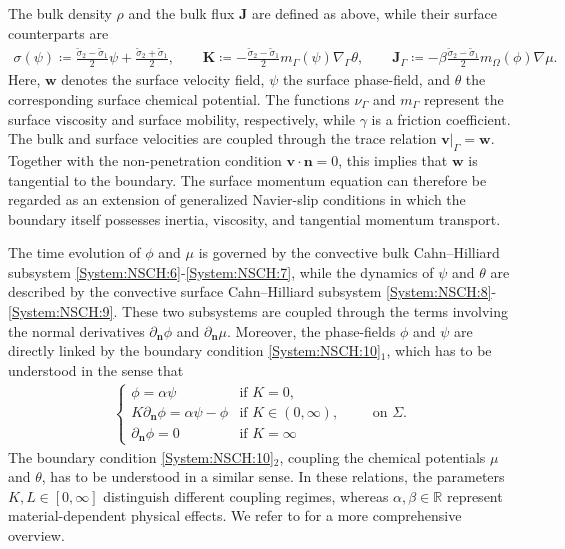 \documentclass[11pt,reqno]{amsart}
\theoremstyle{remark}
\numberwithin{equation}{section}
\newcommand{\R}{\mathbb R}
\newcommand{\n}{\mathbf{n}}
\newcommand{\deln}{\partial_\n}
\newcommand{\Grad}{\nabla}
\newcommand{\Gradg}{\nabla_\Ga}
\newcommand{\Om}{\Omega}
\newcommand{\Ga}{\Gamma}
\newcommand{\J}{\mathbf J}
\newcommand{\K}{\mathbf K}
\newcommand{\bv}{\mathbf v}
\newcommand{\bw}{\mathbf w}
\begin{document}
The bulk density $\rho$ and the bulk flux $\J$ are defined as above, while their surface counterparts are
\begin{align*}
    \sigma(\psi) \coloneqq\frac{\tilde\sigma_2-\tilde\sigma_1}{2}\psi+\frac{\tilde\sigma_2+\tilde\sigma_1}{2}, \qquad\K \coloneqq-\frac{\tilde\sigma_2-\tilde\sigma_1}{2}m_\Ga(\psi)\Gradg\theta, \qquad \J_\Ga \coloneqq-\beta\frac{\tilde\sigma_2-\tilde\sigma_1}{2}m_\Om(\phi)\Grad\mu.
\end{align*}
Here, $\bw$ denotes the surface velocity field, $\psi$ the surface phase-field, and $\theta$ the corresponding surface chemical potential. The functions $\nu_\Ga$ and $m_\Ga$ represent the surface viscosity and surface mobility, respectively, while $\gamma$ is a friction coefficient. The bulk and surface velocities are coupled through the trace relation $\bv\vert_\Ga=\bw$. Together with the non-penetration condition $\bv\cdot\n=0$, this implies that $\bw$ is tangential to the boundary. The surface momentum equation can therefore be regarded as an extension of generalized Navier-slip conditions in which the boundary itself possesses inertia, viscosity, and tangential momentum transport.

The time evolution of $\phi$ and $\mu$ is governed by the convective bulk Cahn--Hilliard subsystem \eqref{System:NSCH:6}-\eqref{System:NSCH:7}, while the dynamics of $\psi$ and $\theta$ are described by the convective surface Cahn--Hilliard subsystem \eqref{System:NSCH:8}-\eqref{System:NSCH:9}. These two subsystems are coupled through the terms involving the normal derivatives $\deln\phi$ and $\deln\mu$. Moreover, the phase-fields $\phi$ and $\psi$ are directly linked by the boundary condition \eqref{System:NSCH:10}$_1$, which has to be understood in the sense that
\begin{align*}
    \begin{cases}
        \phi = \alpha\psi &\text{if~} K = 0, \\
        K\deln\phi = \alpha\psi - \phi &\text{if~}K\in(0,\infty), \\
        \deln\phi = 0 &\text{if~} K = \infty
    \end{cases}
    \qquad\text{on~}\Sigma.
\end{align*}
The boundary condition \eqref{System:NSCH:10}$_2$, coupling the chemical potentials $\mu$ and $\theta$, has to be understood in a similar sense. In these relations, the parameters $K,L\in[0,\infty]$ distinguish different coupling regimes, whereas $\alpha,\beta\in\R$ represent material-dependent physical effects. We refer to \cite{Giorgini2023, Knopf2024} for a more comprehensive overview.
\end{document}
